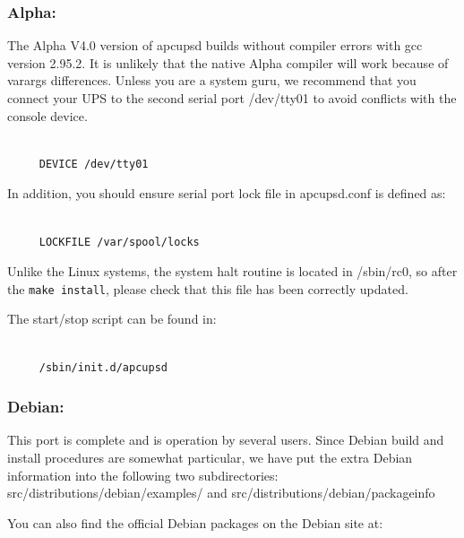 \label{Alpha}

\subsubsection*{Alpha:}

\label{index-Alpha-32}
\label{index-OS_002c-Alpha-33}
The Alpha V4.0 version of apcupsd builds without compiler errors with gcc
version 2.95.2. It is unlikely that the native Alpha compiler will work
because of varargs differences. Unless you are a system guru, we recommend
that you connect your UPS to the second serial port /dev/tty01 to avoid
conflicts with the console device. 

\footnotesize
\begin{verbatim}
     
     DEVICE /dev/tty01
\end{verbatim}
\normalsize

In addition, you should ensure serial port lock file in apcupsd.conf is
defined as: 

\footnotesize
\begin{verbatim}
     
     LOCKFILE /var/spool/locks
\end{verbatim}
\normalsize

Unlike the Linux systems, the system halt routine is located in /sbin/rc0, so
after the {\tt make install}, please check that this file has been correctly
updated.  

The start/stop script can be found in: 

\footnotesize
\begin{verbatim}
     
     /sbin/init.d/apcupsd
\end{verbatim}
\normalsize

\label{Debian}

\subsubsection*{Debian:}

\label{index-Debian-34}
\label{index-OS_002c-Debian-35}
This port is complete and is operation by several users. Since Debian build
and install procedures are somewhat particular, we have put the extra Debian
information into the following two subdirectories:
\lt{}src\gt{}/distributions/debian/examples/ and
\lt{}src\gt{}/distributions/debian/packageinfo  

You can also find the official Debian packages on the Debian site at:  

